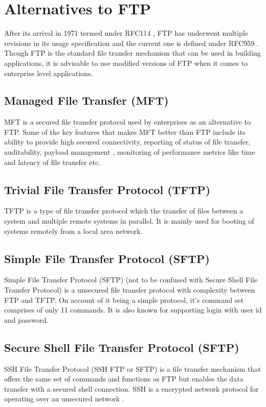 \documentclass[9pt,twocolumn,twoside]{styles/osajnl}
\begin{document}
\section{Alternatives to FTP}

After its arrival in 1971 termed under RFC114 \cite{www-rfc114}, FTP has underwent multiple revisions in its usage specification and the current one is defined under RFC959 \cite{www-rfc959}. Though FTP is the standard file transfer mechanism that can be used in building applications, it is advisable to use modified versions of FTP when it comes to enterprise level applications.

\subsection{Managed File Transfer (MFT)}

MFT \cite{www-wiki-mft} is a secured file transfer protocol used by enterprises as an alternative to FTP. Some of the key features that makes MFT better than FTP include its ability to provide high secured connectivity, reporting of status of file transfer, auditability, payload management , monitoring of performance metrics \cite{www-wiki-perf} like time and latency of file transfer etc. 


\subsection{Trivial File Transfer Protocol (TFTP)}

TFTP \cite{www-wiki-tftp} is a type of file transfer protocol which the transfer of files between a system and multiple remote systems in parallel. It is mainly used for booting of systems remotely from a local area network.

\subsection{Simple File Transfer Protocol (SFTP)}

Simple File Transfer Protocol (SFTP) \cite{www-wiki-ftp} (not to be confused with Secure Shell File Transfer Protocol) is a unsecured file transfer protocol with complexity between FTP and TFTP. On account of it being a simple protocol, it's command set comprises of only 11 commands. It is also known for supporting login with user id and password.

\subsection{Secure Shell File Transfer Protocol (SFTP)}
SSH File Transfer Protocol (SSH FTP or SFTP) \cite{www-wiki-sftp} is a file transfer mechanism that offers the same set of commands and functions as FTP but enables the data transfer with a secured shell connection. SSH is a encrypted network protocol for operating over an unsecured network \cite{www-wiki-ssh}. \\\\
\end{document}
